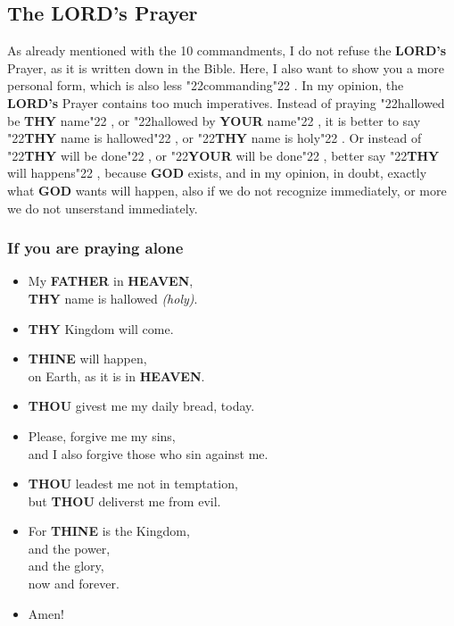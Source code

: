 \documentclass[12pt,a5paper]{article}
\newcommand{\God}[0]{\textbf{GOD}}
\newcommand{\Father}[0]{\textbf{FATHER}}
\newcommand{\Heaven}[0]{\textbf{HEAVEN}}
\newcommand{\Lords}[0]{\textbf{LORD's}}
\newcommand{\Thine}[0]{\textbf{THINE}}
\newcommand{\Thou}[0]{\textbf{THOU}}
\newcommand{\Thy}[0]{\textbf{THY}}
\newcommand{\Your}[0]{\textbf{YOUR}}
\newcommand{\q}[1]{\char"22{#1}\char"22 }
\begin{document}
	\subsection{The {\Lords} Prayer}
		As already mentioned with the 10 commandments,
		I do not refuse the {\Lords} Prayer,
		as it is written down in the Bible.
		Here,
		I also want to show you a more personal form,
		which is also less \q{commanding}.
		In my opinion,
		the {\Lords} Prayer contains too much imperatives.
		Instead of praying \q{hallowed be {\Thy} name},
		or \q{hallowed by {\Your} name},
		it is better to say \q{{\Thy} name is hallowed},
		or \q{{\Thy} name is holy}.
		Or instead of \q{{\Thy} will be done},
		or \q{{\Your} will be done},
		better say \q{{\Thy} will happens},
		because {\God} exists,
		and in my opinion,
		in doubt,
		exactly what {\God} wants will happen,
		also if we do not recognize immediately,
		or more we do not unserstand immediately.

	\subsubsection{If you are praying alone}
		\begin{itemize}[nosep]
			\item	My {\Father} in {\Heaven},
			\\		{\Thy} name is hallowed \textit{(holy)}.
			\item	{\Thy} Kingdom will come.
			\item	{\Thine} will happen,
			\\		on Earth,
					as it is in {\Heaven}.
			\item	{\Thou} givest me my daily bread,
					today.
			\item	Please,
					forgive me my sins,
			\\		and I also forgive those who sin against me.
			\item	{\Thou} leadest me not in temptation,
			\\		but {\Thou} deliverst me from evil.
			\item	For {\Thine} is the Kingdom,
			\\		and the power,
			\\		and the glory,
			\\		now and forever.
			\item	Amen!
	\end{itemize}
	
\end{document}
